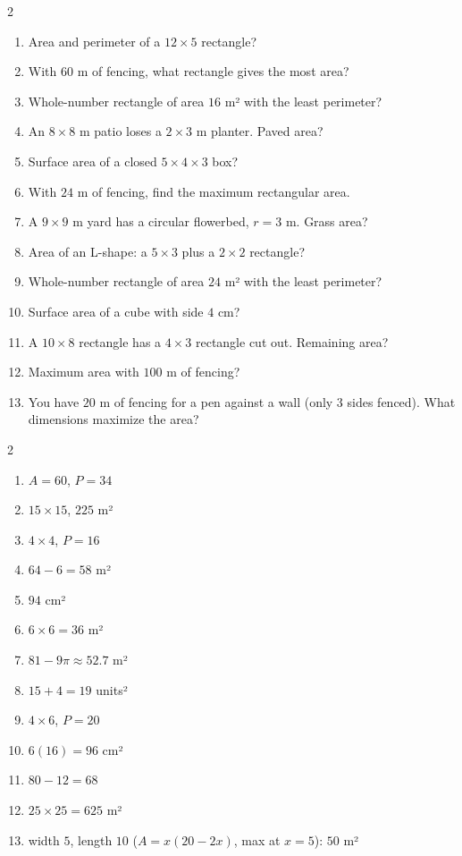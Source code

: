 \documentclass[11pt]{article}
\begin{document}
\begin{recapbox}
\begin{multicols}{2}
\small
\begin{enumerate}[leftmargin=*,itemsep=3pt]
  \item Area and perimeter of a $12\times5$ rectangle?
  \item With $60$ m of fencing, what rectangle gives the most area?
  \item Whole-number rectangle of area $16$ m² with the least perimeter?
  \item An $8\times8$ m patio loses a $2\times3$ m planter. Paved area?
  \item Surface area of a closed $5\times4\times3$ box?
  \item With $24$ m of fencing, find the maximum rectangular area.
  \item A $9\times9$ m yard has a circular flowerbed, $r=3$ m. Grass area?
  \item Area of an L-shape: a $5\times3$ plus a $2\times2$ rectangle?
  \item Whole-number rectangle of area $24$ m² with the least perimeter?
  \item Surface area of a cube with side $4$ cm?
  \item A $10\times8$ rectangle has a $4\times3$ rectangle cut out. Remaining area?
  \item Maximum area with $100$ m of fencing?
  \item You have $20$ m of fencing for a pen against a wall (only 3 sides fenced). What dimensions maximize the area?
\end{enumerate}
\end{multicols}
\end{recapbox}

\begin{keybox}
\begin{multicols}{2}
\small
\begin{enumerate}[leftmargin=*,itemsep=3pt]
  \item $A=60$, $P=34$
  \item $15\times15$, $225$ m²
  \item $4\times4$, $P=16$
  \item $64-6=58$ m²
  \item $94$ cm²
  \item $6\times6=36$ m²
  \item $81-9\pi\approx52.7$ m²
  \item $15+4=19$ units²
  \item $4\times6$, $P=20$
  \item $6(16)=96$ cm²
  \item $80-12=68$
  \item $25\times25=625$ m²
  \item width $5$, length $10$ ($A=x(20-2x)$, max at $x=5$): $50$ m²
\end{enumerate}
\end{multicols}
\end{keybox}
\end{document}
